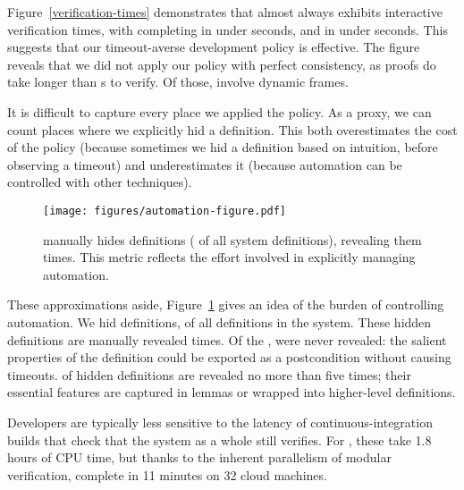 Figure~\ref{verification-times} demonstrates that
{\name} almost always exhibits interactive verification times,
with {\tenSecFasterPctile} completing in under {\tenSecSlowThresholdSecs} seconds,
and {\twentySecFasterPctile} in under {\twentySecSlowThresholdSecs} seconds.
This suggests that our timeout-averse
development policy is effective.
The figure reveals that
we did not apply our policy with perfect consistency,
as {\twentySecNumSlowVerifications} proofs do take longer than
{\twentySecSlowThresholdSecs}s to verify.
Of those, {\twentySecPctOfSlowVerifsInvolvingHeap} involve dynamic frames.

It is difficult to capture every place we applied the policy. As a proxy,
we can count places where we explicitly hid a definition.
This both overestimates the cost of the policy 
(because sometimes we hid a definition based on intuition,
before observing a timeout) and underestimates it (because automation can
be controlled with other techniques).

\begin{figure}
\texttt{[image: figures/automation-figure.pdf]}
  \vspace{-4mm}
  \caption{{\System} manually hides {\autoOpaqueCount} definitions ({\autoOpaquePct} of all system definitions),  revealing
them {\autoRevealCount} times.
This metric reflects the effort involved in explicitly managing automation.
}
  \vspace{-3mm}
\label{automation-histogram}
\end{figure}

These approximations aside, Figure~\ref{automation-histogram}
gives an idea of the burden of controlling automation.
We hid {\autoOpaqueCount} definitions,
{\autoOpaquePct} of all definitions in the system.
These hidden definitions are manually revealed {\autoRevealCount} times.
Of the {\autoOpaqueCount}, {\autoOpaqueZeroReveals} were never revealed:
the salient properties of the definition could be exported as a postcondition
without causing timeouts.
{\autoFivePct} of hidden definitions are revealed no more than five
times; their essential features are captured in lemmas or wrapped into
higher-level definitions.
%

Developers are typically less sensitive to the latency of continuous-integration
builds that check that the system as a whole still verifies.
For \name, these take 1.8 hours of CPU time,
but thanks to the inherent parallelism of modular verification,
complete in 11 minutes on 32 cloud machines.



